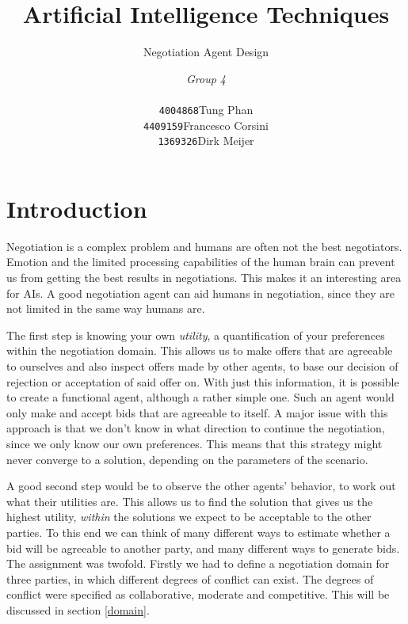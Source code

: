 \documentclass[a4,11pt]{scrartcl}
\title{Artificial Intelligence Techniques}
\subtitle{Negotiation Agent Design}
\author{\emph{Group 4}\\
\begin{tabular}{ll}
\texttt{4004868}&Tung Phan\\
\texttt{4409159}&Francesco Corsini\\
\texttt{1369326}&Dirk Meijer
\end{tabular}}
\begin{document}
\maketitle

\null\vfill
\tableofcontents
\pagebreak

\section{Introduction}

    Negotiation is a complex problem and humans are often not the best 
    negotiators. Emotion and the limited processing capabilities of the 
    human brain can prevent us from getting the best results in 
    negotiations. This makes it an interesting area for AIs. A good 
    negotiation agent can aid humans in negotiation, since they are not 
    limited in the same way humans are.

    The first step is knowing your own \emph{utility}, a quantification 
    of your preferences within the negotiation domain. This allows us 
    to make offers that are agreeable to ourselves and also inspect 
    offers made by other agents, to base our decision of rejection or 
    acceptation of said offer on. With just this information, it is 
    possible to create a functional agent, although a rather simple 
    one. Such an agent would only make and accept bids that are 
    agreeable to itself. A major issue with this approach is that we 
    don't know in what direction to continue the negotiation, since we 
    only know our own preferences. This means that this strategy might 
    never converge to a solution, depending on the parameters of the 
    scenario.

    A good second step would be to observe the other agents' behavior, 
    to work out what their utilities are. This allows us to find the 
    solution that gives us the highest utility, \emph{within} the 
    solutions we expect to be acceptable to the other parties. To this 
    end we can think of many different ways to estimate whether a bid 
    will be agreeable to another party, and many different ways to 
    generate bids. \\

    \noindent The assignment was twofold. Firstly we had to define a 
    negotiation domain for three parties, in which different degrees of 
    conflict can exist. The degrees of conflict were specified as 
    collaborative, moderate and competitive. This will be discussed in 
    section \ref{domain}.
\end{document}
